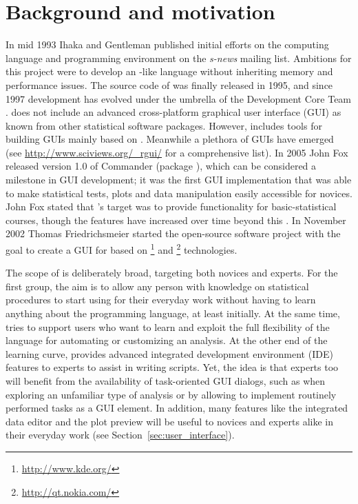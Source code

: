 \section{Background and motivation}
\label{background}
In mid 1993 Ihaka and Gentleman published initial efforts on the computing
language and programming environment  on the \emph{s-news} mailing list. Ambitions for
this project were to develop an -like language without inheriting memory
and performance issues. The source code of  was finally released in 1995, and 
since 1997 development has evolved under the umbrella of the  
Development Core Team \citep{RDCT2001, RDCT2010, Ihaka_Gentlemen_1993}.
 does not include an advanced cross-platform graphical user interface (GUI) as known from other
statistical software packages. However,  includes tools for building GUIs
mainly based on  \citep{Dalgaard2001, Dalgaard2002}. Meanwhile a
plethora of  GUIs have emerged (see \url{http://www.sciviews.org/_rgui/} for a
comprehensive list). In 2005 John Fox released version 1.0 of  Commander (package ), which
can be considered a milestone in  GUI development; it was the first GUI
implementation that was able to make statistical tests,
plots and data manipulation easily accessible for  novices.
John Fox stated that 's target was to provide
functionality for basic-statistical courses, though the features have increased over
time beyond this \citep{Fox2005, Fox2007}. In November 2002 Thomas Friedrichsmeier
started the  open-source software project with the goal to create a GUI for
 based on \footnote{\url{http://www.kde.org/}} and \footnote{\url{http://qt.nokia.com/}} technologies.

The scope of  is deliberately broad, targeting both  novices and experts.
For the first group, the aim is to allow any person with knowledge on
statistical procedures to start using  for their everyday work 
without having to learn anything about the  programming language,
at least initially. At the same time,  tries to support users who want to learn and
exploit the full flexibility of the  language for automating or customizing
an analysis. At the other end of the learning curve,  provides advanced integrated development environment (IDE)
features to  experts to assist in writing  scripts. Yet, the idea
is that  experts too will benefit from the availability of task-oriented GUI
dialogs, such as when exploring an unfamiliar type of analysis
or by allowing to implement routinely performed tasks as a GUI element. In
addition, many features like the integrated data editor and the plot preview 
will be useful to  novices and  experts alike in their everyday work
(see Section~\ref{sec:user_interface}).

